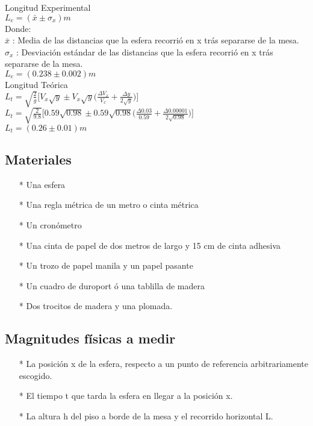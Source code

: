 \documentclass[osajnl,twocolumn,showpacs,superscriptaddress,10pt]{revtex4-1}
\begin{document}
Longitud Experimental\\
$ L_e = (\bar x \pm \sigma_x) m$\\

Donde:\\
$\bar x$ : Media de las distancias que la esfera recorrió en x trás separarse de la mesa.\\
$\sigma_x$ : Desviación estándar de las distancias que la esfera recorrió en x trás separarse de la mesa.\\

$ L_e = (0.238 \pm 0.002) m $\\


Longitud Teórica\\
$ L_t = \sqrt{\frac{2}{g}}\Big[V_x\sqrt{y} \pm V_x\sqrt{y}\big(\frac{\Delta V_x}{V_x} + \frac{\Delta y}{2\sqrt{y}}\big)\Big]$\\
$ L_t = \sqrt{\frac{2}{9.8}}\Big[0.59\sqrt{0.98} \pm 0.59\sqrt{0.98}\big(\frac{\Delta 0.03}{0.59} + \frac{\Delta 0.00001}{2\sqrt{0.98}}\big)\Big]$\\
$ L_t = (0.26 \pm 0.01) m$\\


\subsection{Materiales}
\begin{itemize}
\item[*] Una esfera
\item[*] Una regla métrica de un metro o cinta métrica
\item[*] Un cronómetro
\item[*] Una cinta de papel de dos metros de largo y 15 cm de cinta adhesiva
\item[*] Un trozo de papel manila y un papel pasante
\item[*] Un cuadro de duroport ó una tablilla de madera
\item[*] Dos trocitos de madera y una plomada.

\end{itemize}


\subsection{Magnitudes físicas a medir}
\begin{itemize}
\item[*] La posición x de la esfera, respecto a un punto de referencia arbitrariamente escogido.
\item[*] El tiempo t que tarda la esfera en llegar a la posición x.
\item[*] La altura h del piso a borde de la mesa y el recorrido horizontal L.
\end{itemize}
\end{document}
